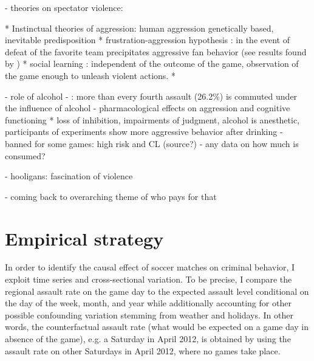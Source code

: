\documentclass[11pt, a4paper]{article} %
\begin{document}
- theories on spectator violence: 
\cite{branscombe1992role}
	
		* Instinctual theories of aggression: human aggression genetically based, inevitable predisposition \cite{baron1977human}
		* frustration-aggression hypothesis \cite{dollard1939frustration}:  in the event of defeat of the favorite team precipitates aggressive fan behavior (see results found by \cite{card2011family})
		* social learning \cite{bandura1973aggression,bandura2007social}: independent of the outcome of the game, observation of the game enough to unleash violent actions. 
		* 


- role of alcohol
		- \cite{PCS2018}: more than every fourth assault (26.2\%) is commuted under the influence of alcohol
		- \cite{cook2013virtuous} pharmacological effects on aggression and cognitive functioning 
			* loss of inhibition, impairments of judgment, alcohol is anesthetic, participants of experiments show more aggressive behavior after drinking 
		- banned for some games: high risk and CL (source?)
		- any data on how much is consumed?
		
	
- hooligans: fascination of violence
	\cite{zis14_15} \cite{feltes2010fussballgewalt}

- coming back to overarching theme of who pays for that
	

\newpage
\section{Empirical strategy}\label{sec_soc_ext:empirical_strategy}

In order to identify the causal effect of soccer matches on criminal behavior, I exploit time series and cross-sectional variation. To be precise, I compare the regional assault rate on the game day to the expected assault level conditional on the day of the week, month, and year while additionally accounting for other possible confounding variation stemming from weather and holidays. In other words, the counterfactual assault rate (what would be expected on a game day in absence of the game), e.g. a Saturday in April 2012, is obtained by using the assault rate on other Saturdays in April 2012, where no games take place. %
\end{document}
